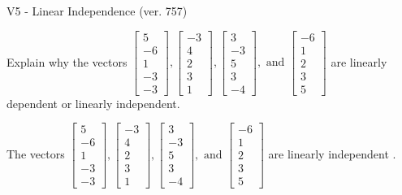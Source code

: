 \begin{exercise}
  \begin{exerciseTitle}V5 - Linear Independence (ver. 757)\end{exerciseTitle}
  \begin{exerciseStatement}
    Explain why the vectors \(\left[\begin{array}{r}
5 \\
-6 \\
1 \\
-3 \\
-3
\end{array}\right] , \left[\begin{array}{r}
-3 \\
4 \\
2 \\
3 \\
1
\end{array}\right] , \left[\begin{array}{r}
3 \\
-3 \\
5 \\
3 \\
-4
\end{array}\right] , \text{ and } \left[\begin{array}{r}
-6 \\
1 \\
2 \\
3 \\
5
\end{array}\right]\) are linearly dependent or linearly independent.	


  \end{exerciseStatement}
  \begin{exerciseAnswer}
   The vectors \(\left[\begin{array}{r}
5 \\
-6 \\
1 \\
-3 \\
-3
\end{array}\right] , \left[\begin{array}{r}
-3 \\
4 \\
2 \\
3 \\
1
\end{array}\right] , \left[\begin{array}{r}
3 \\
-3 \\
5 \\
3 \\
-4
\end{array}\right] , \text{ and } \left[\begin{array}{r}
-6 \\
1 \\
2 \\
3 \\
5
\end{array}\right]\) are 
  	 linearly independent  .
  


  \end{exerciseAnswer}
\end{exercise}